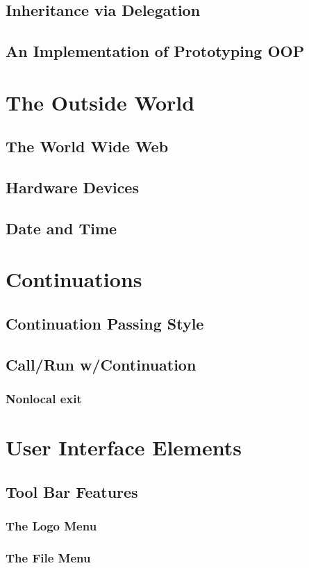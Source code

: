 \documentclass{report}
\begin{document}
\section{Inheritance via Delegation}
\section{An Implementation of Prototyping OOP}
\chapter{The Outside World}
\section{The World Wide Web}
\section{Hardware Devices}
\section{Date and Time}
\chapter{Continuations}
\section{Continuation Passing Style}
\section{Call/Run w/Continuation}
\subsection{Nonlocal exit}
\chapter{User Interface Elements}
\section{Tool Bar Features}
\subsection{The \Snap{} Logo Menu}
\subsection{The File Menu}
\end{document}
